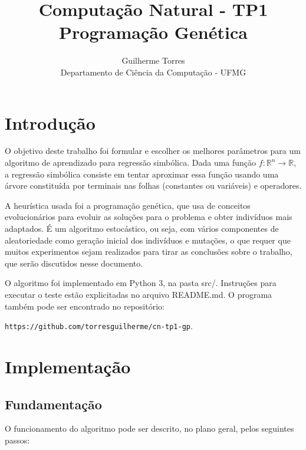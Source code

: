 \documentclass[11pt]{article}
\begin{document}
\title{Computação Natural - TP1\\Programação Genética}
\author{Guilherme Torres\\Departamento de Ciência da Computação - UFMG}
\date{}
\maketitle

\section{Introdução}

O objetivo deste trabalho foi formular e escolher os melhores parâmetros para um algoritmo de aprendizado para regressão simbólica. Dada uma função $f: \mathbb{R}^n \to \mathbb{R}$, a regressão simbólica consiste em tentar aproximar essa função usando uma árvore constituída por terminais nas folhas (constantes ou variáveis) e operadores.
	
A heurística usada foi a programação genética, que usa de conceitos evolucionários para evoluir as soluções para o problema e obter indivíduos mais adaptados. É um algoritmo estocástico, ou seja, com vários componentes de aleatoriedade como geração inicial dos indivíduos e mutações, o que requer que muitos experimentos sejam realizados para tirar as conclusões sobre o trabalho, que serão discutidos nesse documento.

O algoritmo foi implementado em Python 3, na pasta src/. Instruções para executar o teste estão explicitadas no arquivo README.md. O programa também pode ser encontrado no repositório:

\texttt{https://github.com/torresguilherme/cn-tp1-gp}.

\section{Implementação}

\subsection{Fundamentação}

O funcionamento do algoritmo pode ser descrito, no plano geral, pelos seguintes passos:
\end{document}
